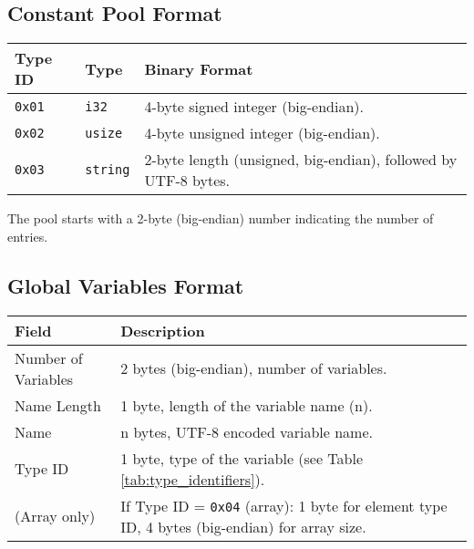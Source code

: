 \documentclass[a4paper,12pt]{article}
\begin{document}
    \subsection{Constant Pool Format}
    \begin{tabular}{|l|l|p{6cm}|}
        \hline
        \textbf{Type ID} & \textbf{Type} & \textbf{Binary Format} \\ \hline
        \texttt{0x01} & \texttt{i32} & 4-byte signed integer (big-endian). \\ \hline
        \texttt{0x02} & \texttt{usize} & 4-byte unsigned integer (big-endian). \\ \hline
        \texttt{0x03} & \texttt{string} & 2-byte length (unsigned, big-endian), followed by UTF-8 bytes. \\ \hline
    \end{tabular}
    \label{tab:constant_pool_format}

    The pool starts with a 2-byte (big-endian) number indicating the number of entries.
    \subsection{Global Variables Format}
    \begin{tabular}{|l|p{9cm}|}
        \hline
        \textbf{Field} & \textbf{Description} \\ \hline
        Number of Variables & 2 bytes (big-endian), number of variables. \\ \hline
        Name Length & 1 byte, length of the variable name (n). \\ \hline
        Name & n bytes, UTF-8 encoded variable name. \\ \hline
        Type ID & 1 byte, type of the variable (see Table \ref{tab:type_identifiers}). \\ \hline
        (Array only) & If Type ID = \texttt{0x04} (array): 1 byte for element type ID, 4 bytes (big-endian) for array size. \\ \hline
    \end{tabular}
    \label{tab:global_variables_format}
\end{document}
